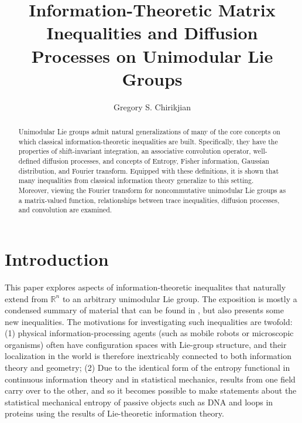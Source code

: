 \documentclass{svmult}
\newcommand{\IR}{\mathbb{R}}
\begin{document}
\mainmatter              %
%
\title{Information-Theoretic Matrix Inequalities and Diffusion Processes on
Unimodular Lie Groups}
%
\author{Gregory S. Chirikjian}
%

\maketitle              %

\begin{abstract}
Unimodular Lie groups admit natural generalizations of many of the core concepts on which classical
information-theoretic inequalities are built.  Specifically, they have the properties of shift-invariant integration,
an associative convolution operator, well-defined diffusion processes, and concepts of Entropy, Fisher information,
Gaussian distribution, and Fourier transform. Equipped with these definitions, it is shown that many inequalities from classical information theory generalize to this setting. Moreover, viewing the Fourier transform for noncommutative unimodular Lie groups as a matrix-valued function, relationships between trace inequalities, diffusion processes, and convolution are
examined.

\end{abstract}


\section{Introduction}

This paper explores aspects of information-theoretic inequalites that naturally extend from $\IR^n$ to an arbitrary
unimodular Lie group. The exposition is mostly a condensed summary of material that can be found in
\cite{vol2,dover}, but also presents some new inequalities. The motivations for investigating such inequalities
are twofold: (1) physical information-processing agents (such as mobile robots or microscopic organisms) often have configuration spaces with Lie-group structure, and their localization in the world is therefore inextricably connected to both information theory and geometry; (2) Due to the identical form of the entropy functional in
continuous information theory and in statistical mechanics, results from one field carry over to the other, and
so it becomes possible to make statements about the statistical mechanical entropy of passive objects such as DNA
and loops in proteins using the results of Lie-theoretic information theory.
\end{document}
